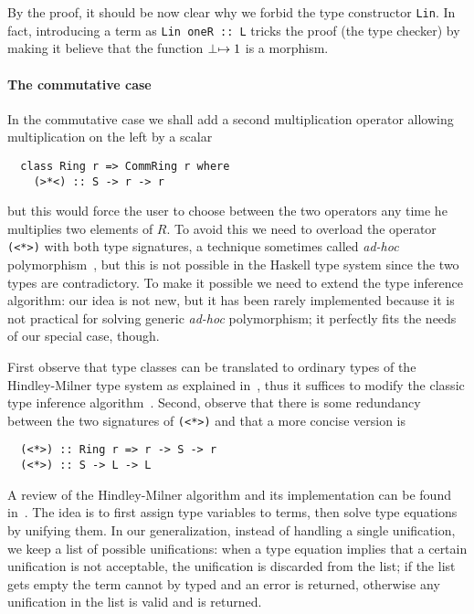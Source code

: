 By the proof, it should be now clear why we forbid the type
constructor \lstinline{Lin}. In fact, introducing a term as
\lstinline{Lin oneR :: L} tricks the proof (the type checker) by
making it believe that the function $\perp\mapsto 1$ is a morphism.


\paragraph{The commutative case}
\label{sec:commutative-case}
In the commutative case we shall add a second multiplication operator
allowing multiplication on the left by a scalar
\begin{lstlisting}
  class Ring r => CommRing r where
    (>*<) :: S -> r -> r 
\end{lstlisting}
but this would force the user to choose between the two operators any
time he multiplies two elements of $R$. To avoid this we need to
overload the operator \lstinline{(<*>)} with both type signatures, a
technique sometimes called \emph{ad-hoc}
polymorphism~\cite{strachey00}, but this is not possible in the
Haskell type system since the two types are contradictory.  To make it
possible we need to extend the type inference algorithm: our idea is
not new, but it has been rarely implemented because it is not
practical for solving generic \emph{ad-hoc} polymorphism; it perfectly
fits the needs of our special case, though.

First observe that type classes can be translated to ordinary types of
the Hindley-Milner type system as explained in~\cite[$\S
4$]{Walder+Blott-ad-hoc-polymorphism}, thus it suffices to modify the
classic type inference
algorithm~\cite{Damas+Milner,Cardelli:Typechecking}. Second, observe
that there is some redundancy between the two signatures of
\lstinline{(<*>)} and that a more concise version is
\begin{lstlisting}
  (<*>) :: Ring r => r -> S -> r
  (<*>) :: S -> L -> L
\end{lstlisting}

A review of the Hindley-Milner algorithm and its implementation can be
found in~\cite{Cardelli:Typechecking}. The idea is to first assign
type variables to terms, then solve type equations by unifying them.
In our generalization, instead of handling a single unification, we
keep a list of possible unifications: when a type equation implies
that a certain unification is not acceptable, the unification is
discarded from the list; if the list gets empty the term cannot by
typed and an error is returned, otherwise any unification in the list
is valid and is returned.

